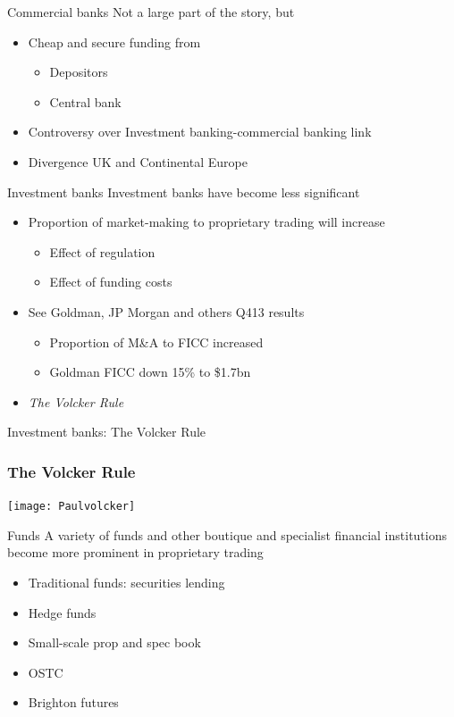 \documentclass[14pt,xcolor=pdftex,dvipsnames,table]{beamer}\usepackage[]{graphicx}\usepackage[]{color}
\begin{document}
\begin{frame}{Commercial banks}
Not a large part of the story, but
\pause
\begin{itemize}[<+-| alert@+>]
\item Cheap and secure funding from 
\begin{itemize}
\item Depositors
\item Central bank
\end{itemize}
\item Controversy over Investment banking-commercial banking link
\item Divergence UK and Continental Europe
\end{itemize}
\end{frame}

\begin{frame}{Investment banks}
Investment banks have become less significant
\pause
\begin{itemize}[<+-| alert@+>]
\item Proportion of market-making to proprietary trading will increase
\begin{itemize}
\item Effect of regulation
\item Effect of funding costs
\end{itemize}
\item See Goldman, JP Morgan and others Q413 results
\begin{itemize}
\item Proportion of M\&A to FICC increased
\item Goldman FICC down 15\% to \$1.7bn
\end{itemize}
\item \emph{The Volcker Rule}
\end{itemize}
\end{frame}

\begin{frame}{Investment banks: The Volcker Rule}
\frametitle{The Volcker Rule}
\begin{center}
\texttt{[image: Paulvolcker]}
\end{center}
\end{frame}

\begin{frame}{Funds}
A variety of funds and other boutique and specialist financial institutions become more prominent in proprietary trading
\begin{itemize}[<+-| alert@+>]
\item Traditional funds: securities lending
\item Hedge funds
\item Small-scale prop and spec book
\item OSTC 
\item Brighton futures
\end{itemize}
\end{frame}
\end{document}
